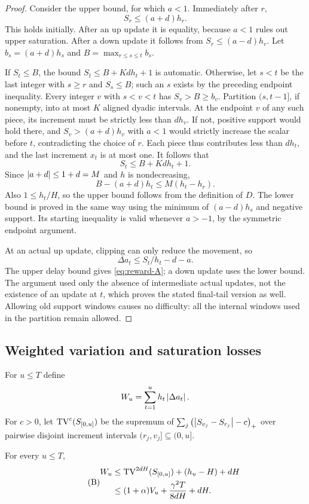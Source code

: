 \begin{proof}
Consider the upper bound, for which $a<1$. Immediately after $r$,
\[
 S_r\le(a+d)h_r.
\]
This holds initially. After an up update it is equality, because $a<1$
rules out upper saturation. After a down update it follows from
$S_r\le(a-d)h_r$. Let $b_s=(a+d)h_s$ and
$B=\max_{r\le s\le t}b_s$.

If $S_t\le B$, the bound $S_t\le B+Kd h_t+1$ is automatic. Otherwise,
let $s<t$ be the last integer with $s\ge r$ and $S_s\le B$; such an
$s$ exists by the preceding endpoint inequality. Every integer $v$ with
$s<v<t$ has $S_v>B\ge b_v$. Partition $(s,t-1]$, if nonempty, into at
most $K$ aligned dyadic intervals. At the endpoint $v$ of any such piece,
its increment must be strictly less than $dh_v$. If not, positive support
would hold there, and $S_v>(a+d)h_v$ with $a<1$ would strictly increase
the scalar before $t$, contradicting the choice of $r$. Each piece thus
contributes less than $dh_t$, and the last increment $x_t$ is at most one.
It follows that
\[
 S_t\le B+Kd h_t+1.
\]
Since $\left|a+d\right|\le1+d=M$ and $h$ is nondecreasing,
\[
 B-(a+d)h_t\le M(h_t-h_r).
\]
Also $1\le h_t/H$, so the upper bound follows from the definition of $D$.
The lower bound is proved in the same way using the minimum of
$(a-d)h_s$ and negative support. Its starting inequality is valid whenever
$a>-1$, by the symmetric endpoint argument.

At an actual up update, clipping can only reduce the movement, so
\[
 \Delta a_t\le S_t/h_t-d-a.
\]
The upper delay bound gives \eqref{eq:reward-A}; a down update uses the
lower bound. The argument used only the absence of intermediate actual
updates, not the existence of an update at $t$, which proves the stated
final-tail version as well. Allowing old support windows causes no
difficulty: all the internal windows used in the partition remain allowed.
\end{proof}

\subsection{Weighted variation and saturation losses}

For $u\le T$ define
\[
 W_u=\sum_{t=1}^u h_t\left|\Delta a_t\right|.
\]
For $c>0$, let $\operatorname{TV}^c(S_{[0,u]})$ be the supremum of
$\sum_j\left(\left|S_{v_j}-S_{r_j}\right|-c\right)_+$ over pairwise disjoint increment
intervals $(r_j,v_j]\subseteq(0,u]$.

\begin{lemma}\label{lem:reward-variation}
For every $u\le T$,
\begin{equation}\tag{B}\label{eq:reward-B}
 \begin{split}
 W_u
 &\le\operatorname{TV}^{2dH}(S_{[0,u]})+(h_u-H)+dH\\
 &\le(1+\alpha)V_u+\frac{\gamma^2T}{8dH}+dH.
 \end{split}
\end{equation}
\end{lemma}

